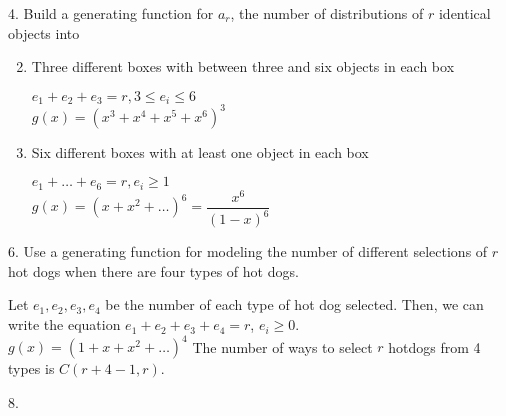 \documentclass[12pt]{article}
\begin{document}
4. Build a generating function for $a_r$, the number of distributions of 
$r$ identical objects into
\begin{enumerate}[label=(\alph*)]
    \setcounter{enumi}{1}
    \item Three different boxes with between three and six objects in 
    each box
    \begin{solution}
        $e_1 + e_2 + e_3 = r, 3 \le e_i \le 6$\\
        $g(x) = (x^3 + x^4 + x^5 + x^6)^3$
    \end{solution}
    \item Six different boxes with at least one object in each box
    \begin{solution}
        $e_1 + \dots + e_6 = r, e_i \ge 1$\\
        $g(x) = (x + x^2 + \dots )^6 = \dfrac{x^6}{(1-x)^6}$
    \end{solution}
\end{enumerate}
6. Use a generating function for modeling the number of different 
selections of $r$ hot dogs when there are four types of hot dogs.
\begin{solution}
    Let $e_1, e_2, e_3, e_4$ be the number of each type of hot dog 
    selected. Then, we can write the equation $e_1 + e_2 + e_3 + e_4 
    = r$, $e_i \ge0$.\\
    $g(x) = (1+x+x^2+\dots)^4$
    The number of ways to select $r$ hotdogs from 4 types is $C(r+4-1,r)$.
\end{solution}
8. 
\end{document}
